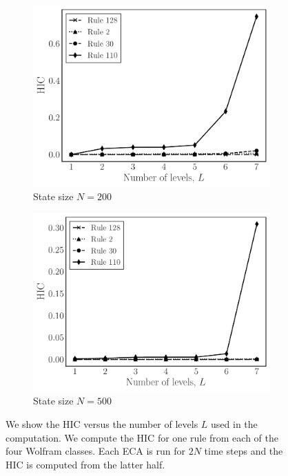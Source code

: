 \begin{figure}[t]
\centering
\begin{subfigure}{0.45\textwidth}
  \includegraphics[width=1.0\textwidth]{figures/hic_vs_num_levels_size_200}
  \caption{State size $N = 200$}
  \label{fig:hic_levels_200}
\end{subfigure}
\begin{subfigure}{0.45\textwidth}
  \includegraphics[width=1.0\textwidth]{figures/hic_vs_num_levels_size_500}
  \caption{State size $N = 500$}
  \label{fig:hic_levels_500}
\end{subfigure}
\caption{We show the HIC versus the number of levels $L$ used in the
    computation. We compute the HIC for one rule from each of the four Wolfram
    classes. Each ECA is run for $2N$ time steps and the HIC is computed from
    the latter half.}
\label{fig:hic_vs_levels}
\end{figure}

